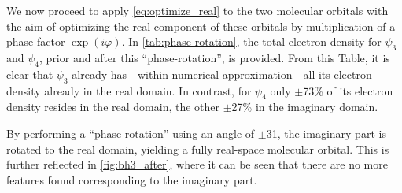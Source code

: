 We now proceed to apply \cref{eq:optimize_real} to the two molecular orbitals with the aim of optimizing the real component of these orbitals by multiplication of a phase-factor $\exp \left(i \varphi \right)$. In \cref{tab:phase-rotation}, the total electron density for $\psi_{3}$ and $\psi_{4}$, prior and after this ``phase-rotation'', is provided. From this Table, it is clear that $\psi_{3}$ already has - within numerical approximation - all its electron density already in the real domain. In contrast, for $\psi_{4}$ only $\pm$73\% of its electron density resides in the real domain, the other $\pm$27\% in the imaginary domain.

By performing a ``phase-rotation'' using an angle of $\pm$31\textdegree, the imaginary part is rotated to the real domain, yielding a fully real-space molecular orbital. This is further reflected in \cref{fig:bh3_after}, where it can be seen that there are no more features found corresponding to the imaginary part.